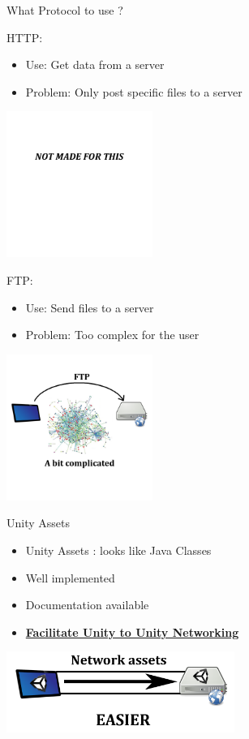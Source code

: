 \documentclass[a4paper,10pt]{beamer}
\begin{document}
			\begin{frame}{What Protocol to use ?}
					\begin{multicols}{2}
						HTTP:
						\begin{itemize}
							\item Use: Get data from a server
							\item Problem: Only post specific files to a server
						\end{itemize}
						\pause
						
						\includegraphics[height=135pt]{images/network/nmft.png}
						\pause
						
						\columnbreak
						FTP:
						\begin{itemize}
							\item Use: Send files to a server
							\item Problem: Too complex for the user
						\end{itemize}
						\pause
						
						\includegraphics[height=135pt]{images/network/classicnet.png}
					\end{multicols}
					
			\end{frame}
			
		\begin{frame}{Unity Assets}
			\begin{itemize}
				\item Unity Assets : looks like Java Classes
				\item Well implemented
				\item Documentation available
				\pause
				\item \textbf{\underline{Facilitate Unity to Unity Networking}}
				\pause
			\end{itemize}
			\centerline{\includegraphics[height=75pt]{images/network/easier.png}}
		\end{frame}
		
\end{document}
